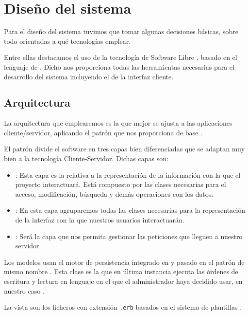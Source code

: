 \section{Diseño del sistema}
Para el diseño del sistema tuvimos que tomar algunas decisiones básicas, sobre
todo orientadas a qué tecnologías emplear.

Entre ellas destacamos el uso de la tecnología de Software Libre , basado en el lenguaje de  . Dicho
 nos proporciona todas las herramientas necesarias para el
desarrollo del sistema incluyendo el de la interfaz cliente.

\subsection{Arquitectura}
La arquitectura que emplearemos es la que mejor se ajusta a las aplicaciones
cliente/servidor, aplicando el patrón  que nos
proporciona de base  \cite{agilerails}.

El patrón  divide el software en tres capas
bien diferenciadas que se adaptan muy bien a la tecnología
Cliente-Servidor. Dichas capas son:

\begin{itemize}
\item {}: Esta capa es la relativa a la representación de la
  información con la que el proyecto interactuará. Está compuesto por las clases
  necesarias para el acceso, modificación, búsqueda y demás operaciones con los
  datos.
\item {}: En esta capa agruparemos todas las clases necesarias para
  la representación de la interfaz con la que nuestros usuarios interactuarán.
\item {}: Será la capa que nos permita gestionar las
  peticiones que lleguen a nuestro servidor.
\end{itemize}

Los modelos usan el motor de persistencia  integrado en
 y pasado en el patrón de mismo nombre 
\cite{pattern:activerecord}. Esta clase es la que en última instancia ejecuta
las órdenes de escritura y lectura en lenguaje  en el
 que el administrador haya decidido usar, en nuestro caso
.

La vista son los ficheros con extensión \texttt{.erb} basados en el sistema de
plantillas .

